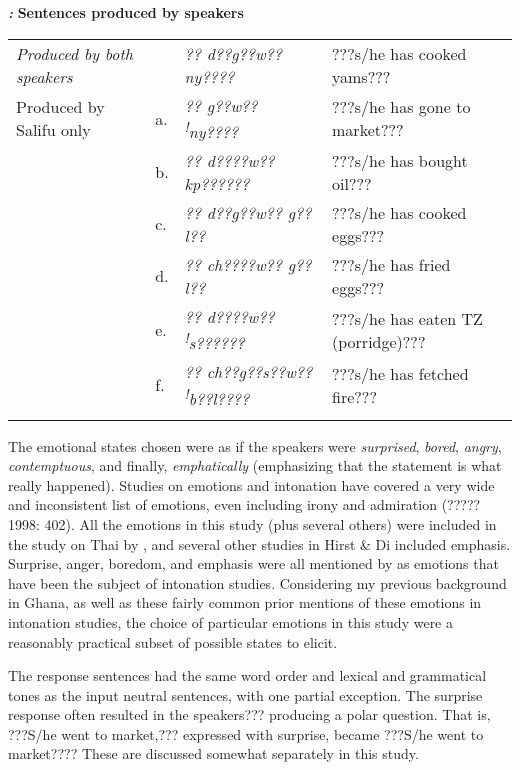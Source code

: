 \documentclass[output=paper]{langsci/langscibook}
\begin{document}
\emph{\textbf{\textup{:}}}\textbf{\textit{ }}\textbf{Sentences produced by speakers}\textbf{\textit{ }}

\begin{tabularx}{\textwidth}{XXXX}
\lsptoprule

\emph{\textup{Produced by both speakers}} &  & \textit{?? d??g??w?? ny????        } & ???s/he has cooked yams???\\
Produced by Salifu only & a. & \textit{?? g??w?? }\textit{\textsuperscript{!}}\textit{ny????} & ???s/he has gone to market???\\
& b. & \textit{?? d????w?? kp??????} & ???s/he has bought oil???\\
& c. & \textit{?? d??g??w?? g??l??} & ???s/he has cooked eggs???\\
& d. & \textit{?? ch????w?? g??l??} & ???s/he has fried eggs???\\
& e. & \textit{?? d????w?? }\textit{\textsuperscript{!}}\textit{s??????} & ???s/he has eaten TZ (porridge)???\\
& f. & \textit{?? ch??g??s??w?? }\textit{\textsuperscript{!}}\textit{b??l????} & ???s/he has fetched fire???  \\
\lspbottomrule
\end{tabularx}
The emotional states chosen were as if the speakers were \emph{surprised}, \emph{bored}, \emph{angry}, \emph{contemptuous}, and finally, \emph{emphatically} (emphasizing that the statement is what really happened). Studies on emotions and intonation have covered a very wide and inconsistent list of emotions, even including irony and admiration (????? 1998: 402). All the emotions in this study (plus several others) were included in the study on Thai by \citet{Luksaneeyanawin1998}, and several other studies in Hirst \& Di\citet{Cristo1998} included emphasis. Surprise, anger, boredom, and emphasis were all mentioned by \citet{Ladd2008} as emotions that have been the subject of intonation studies. Considering my previous background in Ghana, as well as these fairly common prior mentions of these emotions in intonation studies, the choice of particular emotions in this study were a reasonably practical subset of possible states to elicit.

The response sentences had the same word order and lexical and grammatical tones as the input neutral sentences, with one partial exception. The surprise response often resulted in the speakers??? producing a polar question. That is, ???S/he went to market,??? expressed with surprise, became ???S/he went to market???? These are discussed somewhat separately in this study. 
\end{document}
